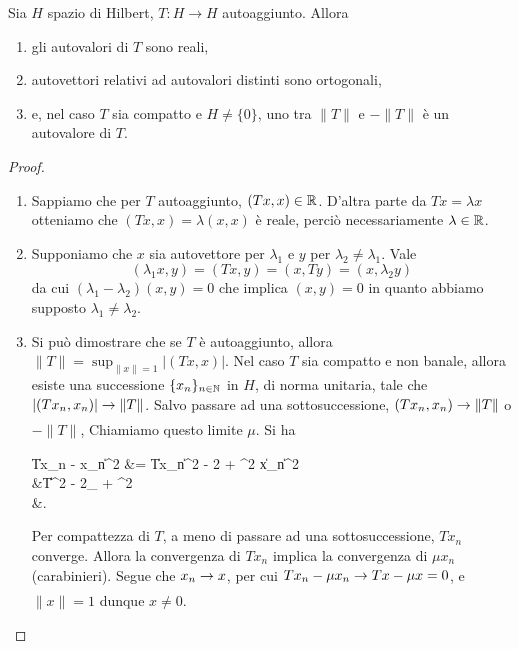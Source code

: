\begin{lemma}
\label{lemma:ops_spectral_selfadjoint}
	Sia $H$ spazio di Hilbert, $T:H \to H$ autoaggiunto.
	Allora
	\begin{enumerate}
		\item gli autovalori di $T$ sono reali,
		\item autovettori relativi ad autovalori distinti sono ortogonali,
		\item e, nel caso $T$ sia compatto e $H\neq \{0\}$, uno tra $\|T\|$ e $-\|T\|$ è un autovalore di $T$.
	\end{enumerate}
\end{lemma}
\begin{proof}
	\leavevmode
	\begin{enumerate}
		\item Sappiamo che per $T$ autoaggiunto, $(Tx,x) \in \mathbb{R}$. D'altra parte da $Tx=\lambda x$ otteniamo che $(Tx,x) = \lambda (x,x)$ è reale, perciò necessariamente $\lambda \in \mathbb{R}$.
		\item Supponiamo che $x$ sia autovettore per $\lambda_1$ e $y$ per $\lambda_2 \neq \lambda_1$. Vale
		\begin{equation*}
			(\lambda_1 x, y) = (Tx, y) = (x, Ty) = (x, \lambda_2 y)
		\end{equation*}
		da cui $(\lambda_1 - \lambda_2)(x,y) = 0$ che implica $(x,y) = 0$ in quanto abbiamo supposto $\lambda_1 \neq \lambda_2$.
		\item Si può dimostrare che se $T$ è autoaggiunto, allora $\|T\| = \sup_{\|x\|=1} |(Tx,x)|$. Nel caso $T$ sia compatto e non banale, allora esiste una successione $\{x_n\}_{n \in \mathbb{N}}$ in $H$, di norma unitaria, tale che $|(Tx_n,x_n)| \underset{{}}{\rightarrow} \|T\|$.
		Salvo passare ad una sottosuccessione, $(Tx_n, x_n) \underset{{}}{\rightarrow} \|T\|$ o $-\|T\|$, Chiamiamo questo limite $\mu$. Si ha
		\begin{eqalign*}
			\|Tx_n - \mu x_n\|^2  &= \|Tx_n\|^2 - 2 \mu {} + \mu^2 \|x_n\|^2\\
			&\leq \|T\|^2 - 2\mu {}_{\conv \mu} + \mu^2\\[-3ex]
			&.
		\end{eqalign*}
		Per compattezza di $T$, a meno di passare ad una sottosuccessione, $Tx_n$ converge. Allora la convergenza di $Tx_n$ implica la convergenza di $\mu x_n$ (carabinieri). Segue che $x_n \underset{{}}{\rightarrow} x$, per cui $Tx_n - \mu x_n \underset{{}}{\rightarrow} Tx - \mu x = 0$, e $\|x\| =1$ dunque $x \neq 0$.
	\end{enumerate}
\end{proof}

